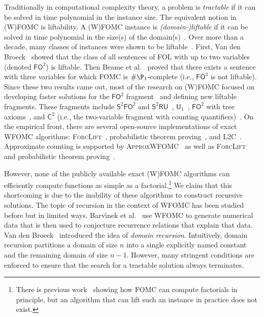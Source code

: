 \documentclass{article}
\theoremstyle{definition}
\newcommand{\FOtwo}{$\mathsf{FO}^{2}$}
\newcommand{\FOthree}{$\mathsf{FO}^{3}$}
\newcommand{\SFO}{$\mathsf{S}^{2}\mathsf{FO}^{2}$}
\newcommand{\SRU}{$\mathsf{S}^{2}\mathsf{RU}$}
\newcommand{\Uone}{$\mathsf{U}_{1}$}
\newcommand{\Ctwo}{$\mathsf{C}^{2}$}
\begin{document}
Traditionally in computational complexity theory, a problem is \emph{tractable}
if it can be solved in time polynomial in the instance size. The equivalent
notion in (W)FOMC is liftability. A (W)FOMC instance is \emph{(domain-)liftable}
if it can be solved in time polynomial in the size(s) of the
domain(s)~\cite{jaeger2012liftability}. Over more than a decade, many classes of
instances were shown to be
liftable~\cite{DBLP:conf/kr/BremenK21,DBLP:conf/nips/KazemiKBP16,DBLP:conf/lics/KuusistoL18,DBLP:journals/jair/Kuzelka21}.
First, Van den Broeck~ showed that the class
of all sentences of FOL with up to two variables (denoted \FOtwo{}) is liftable.
Then Beame et al.~ proved that there exists
a sentence with three variables for which FOMC is $\#\P_{1}$-complete (i.e.,
\FOthree{} is not liftable). Since these two results came out, most of the
research on (W)FOMC focused on developing faster solutions for the \FOtwo{}
fragment~\cite{DBLP:conf/uai/BremenK21,DBLP:conf/aaai/MalhotraS22} and defining
new liftable fragments. These fragments include \SFO{} and
\SRU{}~\cite{DBLP:conf/nips/KazemiKBP16},
\Uone{}~\cite{DBLP:conf/lics/KuusistoL18}, \FOtwo{} with tree
axioms~\cite{DBLP:conf/kr/BremenK21}, and \Ctwo{} (i.e., the two-variable
fragment with counting
quantifiers)~\cite{DBLP:journals/jair/Kuzelka21,DBLP:conf/aaai/MalhotraS22}. On
the empirical front, there are several open-source implementations of exact
WFOMC algorithms: \textsc{ForcLift}~\cite{DBLP:conf/ijcai/BroeckTMDR11},
probabilistic theorem proving~\cite{DBLP:journals/cacm/GogateD16}, and
\textsc{L2C}~\cite{DBLP:conf/kr/KazemiP16}. Approximate counting is supported by
\textsc{ApproxWFOMC}~\cite{DBLP:conf/ijcai/BremenK20} as well as
\textsc{ForcLift}~\cite{DBLP:conf/uai/BroeckCD12} and probabilistic theorem
proving~\cite{DBLP:journals/cacm/GogateD16}.


However, none of the publicly available exact (W)FOMC algorithms can efficiently
compute functions as simple as a factorial.\footnote{There is previous
  work~\cite{DBLP:journals/jair/Kuzelka21,DBLP:conf/ijcai/Broeck16} showing how
  FOMC can compute factorials in principle, but an algorithm that can lift such
  an instance in practice does not exist.} We claim that this shortcoming is due
to the inability of these algorithms to construct recursive solutions. The topic
of recursion in the context of WFOMC has been studied before but in limited
ways. Barv{\'{\i}}nek et al.~ use WFOMC
to generate numerical data that is then used to conjecture recurrence relations
that explain that data. Van den Broeck~
introduced the idea of \emph{domain recursion}. Intuitively, domain recursion
partitions a domain of size $n$ into a single explicitly named constant and the
remaining domain of size $n-1$. However, many stringent conditions are enforced
to ensure that the search for a tractable solution always terminates.
\end{document}
